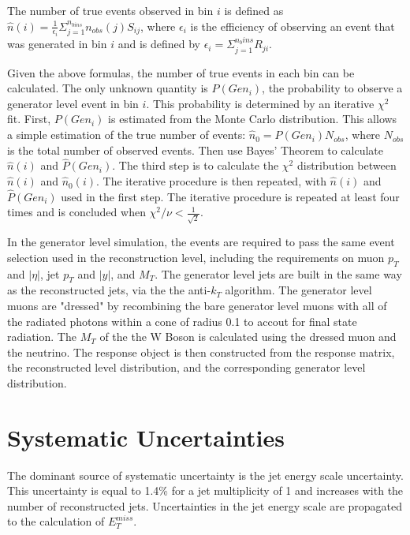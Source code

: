\documentclass[oneside, letterpaper, oldfontcommands]{memoir}
\begin{document}
{{{\qquad The number of true events observed in bin $i$ is defined as $\hat{n}(i) = \frac{1}{\epsilon_{i}}\Sigma_{j=1}^{n_{bins}}n_{obs}(j)S_{ij}$, where $\epsilon_{i}$ is the efficiency of observing an event that was generated in bin $i$ and is defined by $\epsilon_{i}=\Sigma_{j=1}^{n_bins}R_{ji}$.

\qquad Given the above formulas, the number of true events in each bin can be calculated. The only unknown quantity is $P(Gen_{i})$, the probability to observe a generator level event in bin $i$. This probability is determined by an iterative $\chi^2$ fit. First, $P(Gen_{i})$ is estimated from the Monte Carlo distribution. This allows a simple estimation of the true number of events: $\hat{n}_{0} = P(Gen_{i})N_{obs}$, where $N_{obs}$ is the total number of observed events. Then use Bayes' Theorem to calculate $\hat{n}(i)$ and $\hat{P}(Gen_{i})$. The third step is to calculate the $\chi^{2}$ distribution between $\hat{n}(i)$ and $\hat{n}_{0}(i)$. The iterative procedure is then repeated, with $\hat{n}(i)$ and $\hat{P}(Gen_{i})$ used in the first step. The iterative procedure is repeated at least four times and is concluded when $\chi^{2}/\nu < \frac{1}{\sqrt{2}}$.

\qquad In the generator level simulation, the events are required to pass the same event selection used in the reconstruction level, including the requirements on muon $p_{T}$ and $|\eta|$, jet $p_{T}$ and $|y|$, and $M_{T}$. The generator level jets are built in the same way as the reconstructed jets, via the the anti-$k_{T}$ algorithm. The generator level muons are "dressed" by recombining the bare generator level muons with all of the radiated photons within a cone of radius 0.1 to accout for final state radiation. The $M_{T}$ of the the W Boson is calculated using the dressed muon and the neutrino. The response object is then constructed from the response matrix, the reconstructed level distribution, and the corresponding generator level distribution. 

\section{Systematic Uncertainties}

\qquad The dominant source of systematic uncertainty is the jet energy scale uncertainty. This uncertainty is equal to 1.4\% for a jet multiplicity of 1 and increases with the number of reconstructed jets. Uncertainties in the jet energy scale are propagated to the calculation of $E_{T}^{miss}$.

}}}
\end{document}
